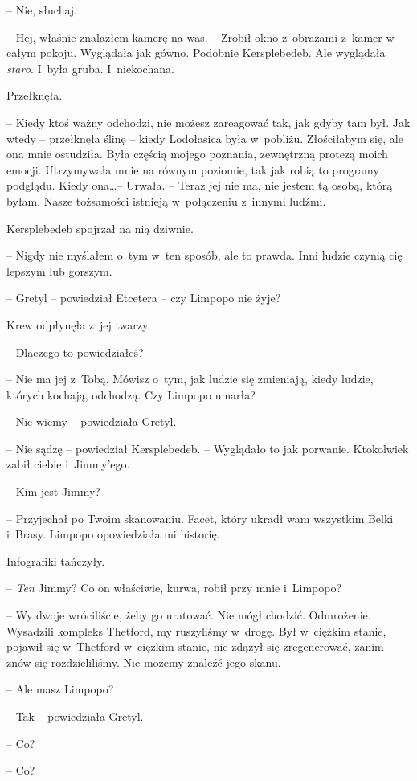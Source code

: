 \documentclass[oneside,polish,11pt,sfheadings]{mwbk}
\begin{document}
-- Nie, słuchaj.

-- Hej, właśnie znalazłem kamerę na was. -- Zrobił okno z~obrazami z~kamer
w całym pokoju. Wyglądała jak gówno. Podobnie Kersplebedeb. Ale
wyglądała \textit{staro}. I~była gruba. I~niekochana.

Przełknęła. 

-- Kiedy ktoś ważny odchodzi, nie możesz zareagować tak, jak
gdyby tam był. Jak wtedy -- przełknęła ślinę -- kiedy Lodołasica była w~pobliżu. Złościłabym się, ale ona mnie ostudziła. Była częścią mojego
poznania, zewnętrzną protezą moich emocji. Utrzymywała mnie na równym
poziomie, tak jak robią to programy podglądu. Kiedy ona\ldots  -- Urwała. -- Teraz jej nie ma, nie jestem tą osobą, którą byłam. Nasze tożsamości
istnieją w~połączeniu z~innymi ludźmi.

Kersplebedeb spojrzał na nią dziwnie. 

-- Nigdy nie myślałem o~tym w~ten
sposób, ale to prawda. Inni ludzie czynią cię lepszym lub gorszym.

-- Gretyl -- powiedział Etcetera -- czy Limpopo nie żyje?

Krew odpłynęła z~jej twarzy.

-- Dlaczego to powiedziałeś?

-- Nie ma jej z~Tobą. Mówisz o~tym, jak ludzie się zmieniają, kiedy
ludzie, których kochają, odchodzą. Czy Limpopo umarła?

-- Nie wiemy -- powiedziała Gretyl.

-- Nie sądzę -- powiedział Kersplebedeb. -- Wyglądało to jak porwanie.
Ktokolwiek zabił ciebie i~Jimmy'ego.

-- Kim jest Jimmy?

-- Przyjechał po Twoim skanowaniu. Facet, który ukradł wam wszystkim
Belki i~Brasy. Limpopo opowiedziała mi historię.

Infografiki tańczyły.

-- \textit{Ten} Jimmy? Co on właściwie, kurwa, robił przy mnie i~Limpopo?

-- Wy dwoje wróciliście, żeby go uratować. Nie mógł chodzić. Odmrożenie.
Wysadzili kompleks Thetford, my ruszyliśmy w~drogę. Był w~ciężkim
stanie, pojawił się w~Thetford w~ciężkim stanie, nie zdążył się
zregenerować, zanim znów się rozdzieliliśmy. Nie możemy znaleźć jego
skanu.

-- Ale masz Limpopo?

-- Tak -- powiedziała Gretyl.

-- Co?

-- Co?
\end{document}
